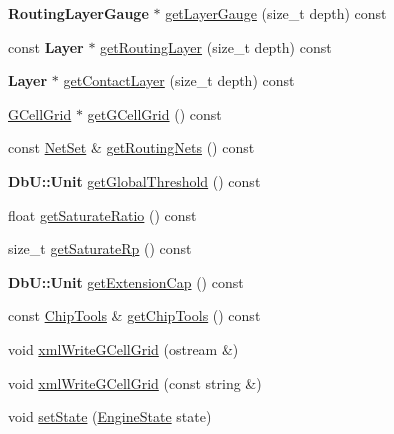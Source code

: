 \begin{DoxyCompactItemize}
\item 
\textbf{ Routing\+Layer\+Gauge} $\ast$ \mbox{\hyperlink{classKatabatic_1_1KatabaticEngine_a0b7c308ac7fccc21dd0401c6ce70a586}{get\+Layer\+Gauge}} (size\+\_\+t depth) const
\item 
const \textbf{ Layer} $\ast$ \mbox{\hyperlink{classKatabatic_1_1KatabaticEngine_afa7ea850397e87889733ac959833b49f}{get\+Routing\+Layer}} (size\+\_\+t depth) const
\item 
\textbf{ Layer} $\ast$ \mbox{\hyperlink{classKatabatic_1_1KatabaticEngine_a4c4549515aef37e81f2cc6537b931edc}{get\+Contact\+Layer}} (size\+\_\+t depth) const
\item 
\mbox{\hyperlink{classKatabatic_1_1GCellGrid}{G\+Cell\+Grid}} $\ast$ \mbox{\hyperlink{classKatabatic_1_1KatabaticEngine_a9a56286f633fddd702d66563de457a4a}{get\+G\+Cell\+Grid}} () const
\item 
const \mbox{\hyperlink{classKatabatic_1_1KatabaticEngine_a92ed88f9aecd2f195089c4029fa8bcc7}{Net\+Set}} \& \mbox{\hyperlink{classKatabatic_1_1KatabaticEngine_a8f661928f8f709552c8486d68ac33c55}{get\+Routing\+Nets}} () const
\item 
\textbf{ Db\+U\+::\+Unit} \mbox{\hyperlink{classKatabatic_1_1KatabaticEngine_a094b479155d3f30ec54e252c35dcffa3}{get\+Global\+Threshold}} () const
\item 
float \mbox{\hyperlink{classKatabatic_1_1KatabaticEngine_a44d2c1fbd97dd09b102b461e906367a0}{get\+Saturate\+Ratio}} () const
\item 
size\+\_\+t \mbox{\hyperlink{classKatabatic_1_1KatabaticEngine_a61977cc1fd981e7f1c6125189ed20509}{get\+Saturate\+Rp}} () const
\item 
\textbf{ Db\+U\+::\+Unit} \mbox{\hyperlink{classKatabatic_1_1KatabaticEngine_ad9072cfa6215c92c9a9842270cf677c5}{get\+Extension\+Cap}} () const
\item 
const \mbox{\hyperlink{classKatabatic_1_1ChipTools}{Chip\+Tools}} \& \mbox{\hyperlink{classKatabatic_1_1KatabaticEngine_a423f5f2214c8b9fe73da9a86b6f6d9b9}{get\+Chip\+Tools}} () const
\item 
void \mbox{\hyperlink{classKatabatic_1_1KatabaticEngine_aecbe8bdcc61024a7539de3ea932c5e06}{xml\+Write\+G\+Cell\+Grid}} (ostream \&)
\item 
void \mbox{\hyperlink{classKatabatic_1_1KatabaticEngine_a78394ac380a0fa462f268dcc2becc50e}{xml\+Write\+G\+Cell\+Grid}} (const string \&)
\item 
void \mbox{\hyperlink{classKatabatic_1_1KatabaticEngine_a2391b9bfcb773398b9661b5ac0ef1a30}{set\+State}} (\mbox{\hyperlink{namespaceKatabatic_ab9e409db5feff0bdbc85e90e2a029cda}{Engine\+State}} state)

\end{DoxyCompactItemize}

